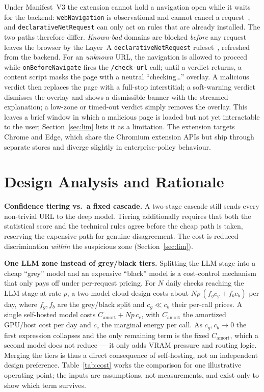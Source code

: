 \documentclass[conference]{IEEEtran}
\begin{document}
Under Manifest~V3 the extension cannot hold a navigation open while it waits for
the backend: \texttt{webNavigation} is observational and cannot cancel a
request~\cite{chrome_webnav}, and \texttt{declarativeNetRequest} can only act on
rules that are already installed. The two paths therefore differ. \emph{Known-bad}
domains are blocked \emph{before} any request leaves the browser by the Layer~A
\texttt{declarativeNetRequest} ruleset~\cite{chrome_dnr}, refreshed from the
backend. For an \emph{unknown} URL, the navigation is allowed to proceed while
\texttt{onBeforeNavigate} fires the \texttt{/check-url} call; until a verdict
returns, a content script masks the page with a neutral ``checking\ldots''
overlay. A malicious verdict then replaces the page with a full-stop
interstitial; a soft-warning verdict dismisses the overlay and shows a dismissible
banner with the streamed explanation; a low-zone or timed-out verdict simply
removes the overlay. This leaves a brief window in which a malicious page is
loaded but not yet interactable to the user; Section~\ref{sec:lim} lists it as a
limitation. The extension targets Chrome and Edge, which share the Chromium
extension APIs but ship through separate stores and diverge slightly in
enterprise-policy behaviour.

\section{Design Analysis and Rationale}
\label{sec:rationale}
\textbf{Confidence tiering vs.\ a fixed cascade.} A two-stage cascade still sends
every non-trivial URL to the deep model. Tiering additionally requires that both
the statistical score and the technical rules agree before the cheap path is
taken, reserving the expensive path for genuine disagreement. The cost is
reduced discrimination \emph{within} the suspicious zone (Section~\ref{sec:lim}).

\textbf{One LLM zone instead of grey/black tiers.} Splitting the LLM stage into a
cheap ``grey'' model and an expensive ``black'' model is a cost-control mechanism
that only pays off under per-request pricing. For $N$ daily checks reaching the
LLM stage at rate $p$, a two-model cloud design costs about
$N p\,(f_g c_g + f_b c_b)$ per day, where $f_g,f_b$ are the grey/black split and
$c_g \ll c_b$ their per-call prices. A single self-hosted model costs
$C_\text{amort} + N p\,c_e$, with $C_\text{amort}$ the amortized GPU/host cost per
day and $c_e$ the marginal energy per call. As $c_g, c_b \to 0$ the first
expression collapses and the only remaining term is the fixed $C_\text{amort}$,
which a second model does not reduce --- it only adds VRAM pressure and routing
logic. Merging the tiers is thus a direct consequence of self-hosting, not an
independent design preference. Table~\ref{tab:cost} works the comparison for one
illustrative operating point; the inputs are assumptions, not measurements, and
exist only to show which term survives.
\end{document}

